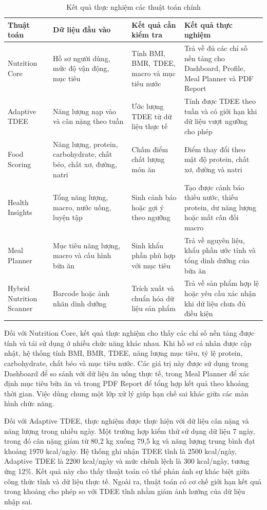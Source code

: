 \begin{table}[H]
\centering
\caption{Kết quả thực nghiệm các thuật toán chính}
\begin{tabular}{|p{3cm}|p{4cm}|p{4cm}|p{4cm}|}
\hline
\textbf{Thuật toán} & \textbf{Dữ liệu đầu vào} & \textbf{Kết quả cần kiểm tra} & \textbf{Kết quả thực nghiệm} \\ \hline
Nutrition Core & Hồ sơ người dùng, mức độ vận động, mục tiêu & Tính BMI, BMR, TDEE, macro và mục tiêu nước & Trả về đủ các chỉ số nền tảng cho Dashboard, Profile, Meal Planner và PDF Report \\ \hline
Adaptive TDEE & Năng lượng nạp vào và cân nặng theo tuần & Ước lượng TDEE từ dữ liệu thực tế & Tính được TDEE theo tuần và có giới hạn khi dữ liệu vượt ngưỡng cho phép \\ \hline
Food Scoring & Năng lượng, protein, carbohydrate, chất béo, chất xơ, đường, natri & Chấm điểm chất lượng món ăn & Điểm thay đổi theo mật độ protein, chất xơ, đường và natri \\ \hline
Health Insights & Tổng năng lượng, macro, nước uống, luyện tập & Sinh cảnh báo hoặc gợi ý theo ngưỡng & Tạo được cảnh báo thiếu nước, thiếu protein, dư năng lượng hoặc mất cân đối macro \\ \hline
Meal Planner & Mục tiêu năng lượng, macro và cấu hình bữa ăn & Sinh khẩu phần phù hợp với mục tiêu & Trả về nguyên liệu, khẩu phần ước tính và tổng dinh dưỡng của bữa ăn \\ \hline
Hybrid Nutrition Scanner & Barcode hoặc ảnh nhãn dinh dưỡng & Trích xuất và chuẩn hóa dữ liệu sản phẩm & Trả về sản phẩm hợp lệ hoặc yêu cầu xác nhận khi dữ liệu chưa đủ điều kiện \\ \hline
\end{tabular}
\end{table}

Đối với Nutrition Core, kết quả thực nghiệm cho thấy các chỉ số nền tảng được tính và tái sử dụng ở nhiều chức năng khác nhau. Khi hồ sơ cá nhân được cập nhật, hệ thống tính BMI, BMR, TDEE, năng lượng mục tiêu, tỷ lệ protein, carbohydrate, chất béo và mục tiêu nước. Các giá trị này được sử dụng trong Dashboard để so sánh với dữ liệu ăn uống thực tế, trong Meal Planner để xác định mục tiêu bữa ăn và trong PDF Report để tổng hợp kết quả theo khoảng thời gian. Việc dùng chung một lớp xử lý giúp hạn chế sai khác giữa các màn hình chức năng.

Đối với Adaptive TDEE, thực nghiệm được thực hiện với dữ liệu cân nặng và năng lượng trong nhiều ngày. Một trường hợp kiểm thử sử dụng dữ liệu 7 ngày, trong đó cân nặng giảm từ 80,2 kg xuống 79,5 kg và năng lượng trung bình đạt khoảng 1970 kcal/ngày. Hệ thống ghi nhận TDEE tĩnh là 2500 kcal/ngày, Adaptive TDEE là 2200 kcal/ngày và mức chênh lệch là 300 kcal/ngày, tương ứng 12\%. Kết quả này cho thấy thuật toán có thể phản ánh sự khác biệt giữa công thức tĩnh và dữ liệu thực tế. Ngoài ra, thuật toán có cơ chế giới hạn kết quả trong khoảng cho phép so với TDEE tĩnh nhằm giảm ảnh hưởng của dữ liệu nhập sai.

